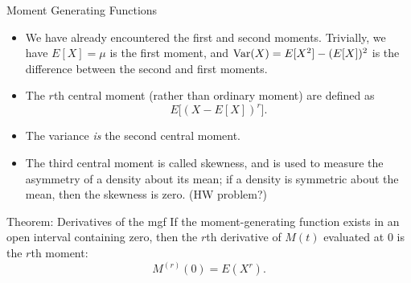 \begin{frame}[allowframebreaks]{Moment Generating Functions}
\begin{itemize}
    \item We have already encountered the first and second moments. Trivially, we have $E[X] =\mu$ is the first moment, and $\mathrm{Var}(X) = E[X^2] - (E[X])^2$ is the difference between the second and first moments.
    \item The $r$th \alert{central moment} (rather than ordinary moment) are defined as
    $$
    E\big[(X - E[X])^r\big].
    $$
    \item The variance \emph{is} the second central moment.
    \item The third central moment is called \alert{skewness}, and is used to measure the asymmetry of a density about its mean; if a density is symmetric about the mean, then the skewness is zero. (HW problem?)
  \end{itemize}
  
  \framebreak
  
  \begin{block}{Theorem: Derivatives of the mgf}
    If the moment-generating function exists in an open interval containing zero, then the $r$th derivative of $M(t)$ evaluated at $0$ is the $r$th moment:
    $$
    M^{(r)}(0) = E(X^r).
    $$
    

\end{block}
\end{frame}
